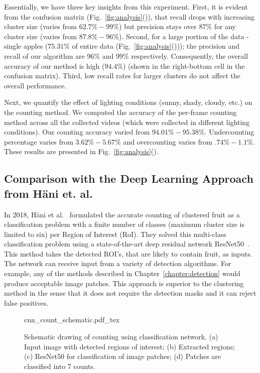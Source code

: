 Essentially, we have three key insights from this experiment. First, it is evident from the confusion matrix (Fig.~\ref{fig:analysis}()), that recall drops with increasing cluster size (varies from $62.7\% - 99\%$) but precision stays over $87\%$ for any cluster size (varies from $87.8\% - 96\%$). Second, for a large portion of the data - single apples ($75.31\%$ of entire data (Fig.~\ref{fig:analysis}())); the precision and recall of our algorithm are $96\%$ and $99\%$ respectively. Consequently, the overall accuracy of our method is high ($94.4\%$) (shown in the right-bottom cell in the confusion matrix). Third, low recall rates for larger clusters do not affect the overall performance. 

Next, we quantify the effect of lighting conditions (sunny, shady, cloudy, etc.) on the counting method. We computed the accuracy of the per-frame counting method across all the collected videos (which were collected in different lighting conditions). Our counting accuracy varied from $94.01\% - 95.38\%$. Undercounting percentage varies from $3.62\%- 5.67\%$ and overcounting varies from $.74\% - 1.1\%$. These results are presented in Fig.~\ref{fig:analysis}().


\subsection{Comparison with the Deep Learning Approach from H{\"a}ni et. al.~\cite{hani_jfr_counting}}\label{subsec:count_result}
In 2018, H{\"a}ni et al.~\cite{hani_jfr_counting} formulated the accurate counting of clustered fruit as a classification problem with a finite number of classes (maximum cluster size is limited to six) per Region of Interest (RoI). They solved this multi-class classification problem using a state-of-the-art deep residual network ResNet50~\cite{he_deep_2015}.  This method takes the detected ROI's, that are likely to contain fruit, as inputs. The network can receive input from a variety of detection algorithms. For example, any of the methods described in Chapter~\ref{chapter:detection} would produce acceptable image patches. This approach is superior to the clustering method in the sense that it does not require the detection masks and it can reject false positives. 
\begin{figure}[!hbpt]
    \centering
    \def\svgwidth{0.95\textwidth}
     \def\svgwidth{\textwidth}
    {cnn_count_schematic.pdf_tex}\label{fig:cnn}
    \caption[Counting using classification network.]{Schematic drawing of counting using classification network. (a) Input image with detected regions of interest; (b) Extracted regions; (c) ResNet50 for classification of image patches; (d) Patches are classified into 7 counts.}
    \label{fig:cnnpipeline}
\end{figure}

